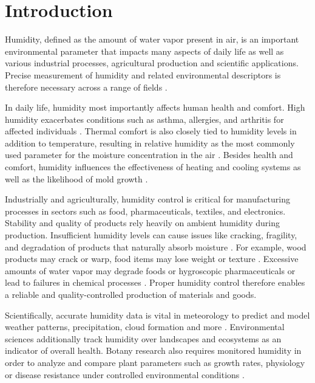 
\chapter{Introduction}\label{s:introduction}
Humidity, defined as the amount of water vapor present in air, is an important environmental parameter that impacts many aspects of daily life as well as various industrial processes, agricultural production and scientific applications. Precise measurement of humidity and related environmental descriptors is therefore necessary across a range of fields \autocite{korotcenkovHandbookHumidityMeasurement2018}.

In daily life, humidity most importantly affects human health and comfort. High humidity exacerbates conditions such as asthma, allergies, and arthritis for affected individuals \autocite{andersenAsthmaIndoorEnvironment1986, aikmanAssociationArthritisWeather1997}. Thermal comfort is also closely tied to humidity levels in addition to temperature, resulting in relative humidity as the most commonly used parameter for the moisture concentration in the air \autocite{alsmoVentilationRelativeHumidity2014}. Besides health and comfort, humidity influences the effectiveness of heating and cooling systems as well as the likelihood of mold growth \autocite{blockHumidityRequirementsMold1953}.

Industrially and agriculturally, humidity control is critical for manufacturing processes in sectors such as food, pharmaceuticals, textiles, and electronics. Stability and quality of products rely heavily on ambient humidity during production. Insufficient humidity levels can cause issues like cracking, fragility, and degradation of products that naturally absorb moisture \autocite{osenbachCorrosioninducedDegradationMicroelectronic1996}. For example, wood products may crack or warp, food items may lose weight or texture \autocite{wangReviewLongtermEffects2021}. Excessive amounts of water vapor may degrade foods or hygroscopic pharmaceuticals or lead to failures in chemical processes \autocite{blockHumidityRequirementsMold1953}. Proper humidity control therefore enables a reliable and quality-controlled production of materials and goods.

Scientifically, accurate humidity data is vital in meteorology to predict and model weather patterns, precipitation, cloud formation and more \autocite{heerwaardenRelativeHumidityIndicator2008}. Environmental sciences additionally track humidity over landscapes and ecosystems as an indicator of overall health. Botany research also requires monitored humidity in order to analyze and compare plant parameters such as growth rates, physiology or disease resistance under controlled environmental conditions \autocite{talbottRelativeHumidityKey2003}.

